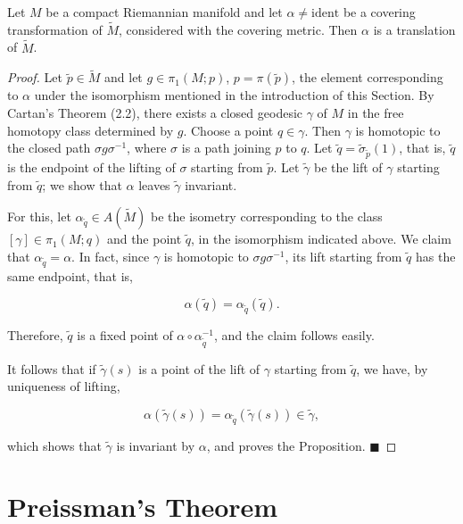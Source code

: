 \begin{proposition}
  \label{prop:dc-ch12-2-6}
  Let $M$ be a compact Riemannian manifold and let $\alpha\neq\mathrm{ident}$ be a covering transformation
  of $\tilde{M}$, considered with the covering metric. Then $\alpha$ is a
  translation of $\tilde{M}$.
\end{proposition}
\begin{proof}
  Let $\tilde{p}\in\tilde{M}$ and let $g\in\pi_1(M;p)$, $p=\pi(\tilde{p})$,
  the element corresponding to $\alpha$ under the isomorphism mentioned in the
  introduction of this Section. By
  Cartan's Theorem (2.2), there exists a closed geodesic $\gamma$ of $M$ in the
  free homotopy class determined by $g$. Choose a point $q\in\gamma$. Then $\gamma$
  is homotopic to the closed path $\sigma g\sigma^{-1}$, where $\sigma$ is a path
  joining $p$ to $q$. Let $\tilde{q}=\tilde{\sigma}_{\tilde{p}}(1)$, that is,
  $\tilde{q}$ is the endpoint of the lifting of $\sigma$ starting from $\tilde{p}$.
  Let $\tilde{\gamma}$ be the lift of $\gamma$ starting from $\tilde{q}$; we show
  that $\alpha$ leaves $\tilde{\gamma}$ invariant.
  
  For this, let $\alpha_{\tilde{q}}\in A(\tilde{M})$ be the isometry corresponding
  to the class $[\gamma]\in\pi_1(M;q)$ and the point $\tilde{q}$, in the isomorphism
  indicated above. We claim that $\alpha_{\tilde{q}}=\alpha$. In fact, since
  $\gamma$ is homotopic to $\sigma g\sigma^{-1}$, its lift starting from $\tilde{q}$
  has the same endpoint, that is,
  
  $$
  \alpha(\tilde{q})=\alpha_{\tilde{q}}(\tilde{q}).
  $$
  
  Therefore, $\tilde{q}$ is a fixed point of $\alpha\circ\alpha_{\tilde{q}}^{-1}$,
  and the claim follows easily.
  
  It follows that if $\tilde{\gamma}(s)$ is a point of the lift of $\gamma$ starting
  from $\tilde{q}$, we have, by uniqueness of lifting,
  
  $$
  \alpha(\tilde{\gamma}(s))=\alpha_{\tilde{q}}(\tilde{\gamma}(s))\in\tilde{\gamma},
  $$
  
  which shows that $\tilde{\gamma}$ is invariant by $\alpha$, and proves the
  Proposition. $\blacksquare$
\end{proof}

\section{Preissman's Theorem}

